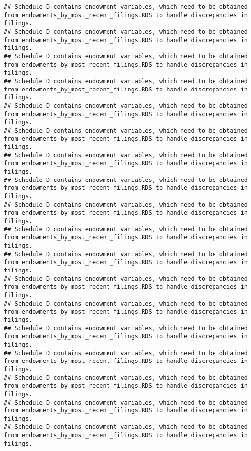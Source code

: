 \documentclass[
]{article}
\begin{document}
\begin{verbatim}
## Schedule D contains endowment variables, which need to be obtained from endowments_by_most_recent_filings.RDS to handle discrepancies in filings.
## Schedule D contains endowment variables, which need to be obtained from endowments_by_most_recent_filings.RDS to handle discrepancies in filings.
## Schedule D contains endowment variables, which need to be obtained from endowments_by_most_recent_filings.RDS to handle discrepancies in filings.
## Schedule D contains endowment variables, which need to be obtained from endowments_by_most_recent_filings.RDS to handle discrepancies in filings.
## Schedule D contains endowment variables, which need to be obtained from endowments_by_most_recent_filings.RDS to handle discrepancies in filings.
## Schedule D contains endowment variables, which need to be obtained from endowments_by_most_recent_filings.RDS to handle discrepancies in filings.
## Schedule D contains endowment variables, which need to be obtained from endowments_by_most_recent_filings.RDS to handle discrepancies in filings.
## Schedule D contains endowment variables, which need to be obtained from endowments_by_most_recent_filings.RDS to handle discrepancies in filings.
## Schedule D contains endowment variables, which need to be obtained from endowments_by_most_recent_filings.RDS to handle discrepancies in filings.
## Schedule D contains endowment variables, which need to be obtained from endowments_by_most_recent_filings.RDS to handle discrepancies in filings.
## Schedule D contains endowment variables, which need to be obtained from endowments_by_most_recent_filings.RDS to handle discrepancies in filings.
## Schedule D contains endowment variables, which need to be obtained from endowments_by_most_recent_filings.RDS to handle discrepancies in filings.
## Schedule D contains endowment variables, which need to be obtained from endowments_by_most_recent_filings.RDS to handle discrepancies in filings.
## Schedule D contains endowment variables, which need to be obtained from endowments_by_most_recent_filings.RDS to handle discrepancies in filings.
## Schedule D contains endowment variables, which need to be obtained from endowments_by_most_recent_filings.RDS to handle discrepancies in filings.
## Schedule D contains endowment variables, which need to be obtained from endowments_by_most_recent_filings.RDS to handle discrepancies in filings.
## Schedule D contains endowment variables, which need to be obtained from endowments_by_most_recent_filings.RDS to handle discrepancies in filings.
## Schedule D contains endowment variables, which need to be obtained from endowments_by_most_recent_filings.RDS to handle discrepancies in filings.

\end{verbatim}
\end{document}
